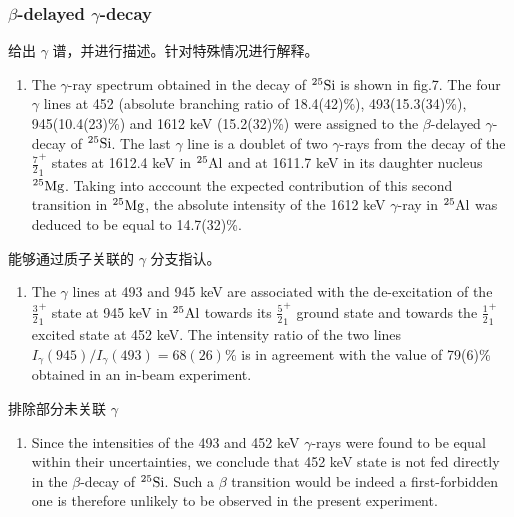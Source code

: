 \documentclass[UTF8]{ctexart}
\begin{document}
\subsubsection{$\beta$-delayed $\gamma$-decay}
给出 $\gamma$ 谱，并进行描述。针对特殊情况进行解释。
\begin{enumerate}
    \item The $\gamma$-ray spectrum obtained in the decay of $^{25}\textnormal{Si}$ is shown in fig.7. The four $\gamma$ lines at 452 (absolute branching ratio of 18.4(42)\%), 493(15.3(34)\%), 945(10.4(23)\%) and 1612 keV (15.2(32)\%) were assigned to the $\beta$-delayed $\gamma$-decay of $^{25}\textnormal{Si}$. The last $\gamma$ line is a doublet of two $\gamma$-rays from the decay of the $\frac{7}{2}_{1}^{+}$ states at 1612.4 keV in $^{25}\textnormal{Al}$ and at 1611.7 keV in its daughter nucleus $^{25}\textnormal{Mg}$. Taking into acccount the expected contribution of this second transition in $^{25}\textnormal{Mg}$, the absolute intensity of the 1612 keV $\gamma$-ray in $^{25}\textnormal{Al}$ was deduced to be equal to 14.7(32)\%.
\end{enumerate}

能够通过质子关联的 $\gamma$ 分支指认。
\begin{enumerate}
    \item The $\gamma$ lines at 493 and 945 keV are associated with the de-excitation of the $\frac{3}{2}_{1}^{+}$ state at 945 keV in $^{25}\textnormal{Al}$ towards its $\frac{5}{2}_{1}^{+}$ ground state and towards the $\frac{1}{2}_{1}^{+}$ excited state at 452 keV. The intensity ratio of the two lines $I_{\gamma}(945)/I_{\gamma }(493)=68(26)\%$ is in agreement with the value of 79(6)\% obtained in an in-beam experiment.
\end{enumerate}

排除部分未关联 $\gamma$
\begin{enumerate}
    \item Since the intensities of the 493 and 452 keV $\gamma$-rays were found to be equal within their uncertainties, we conclude that 452 keV state is not fed directly in the $\beta$-decay of $^{25}\textnormal{Si}$. Such a $\beta$ transition would be indeed a first-forbidden one is therefore unlikely to be observed in the present experiment.
\end{enumerate}
\end{document}

